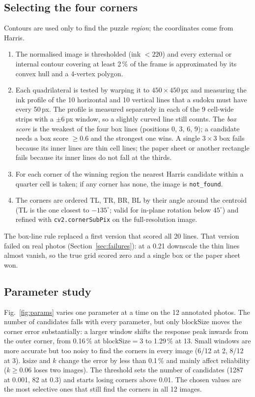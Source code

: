 \documentclass[conference]{IEEEtran}
\begin{document}
\subsection{Selecting the four corners}
Contours are used only to find the puzzle \emph{region}; the coordinates come from Harris.
\begin{enumerate}
\item The normalised image is thresholded (ink $<220$) and every external or internal contour
covering at least 2\,\% of the frame is approximated by its convex hull and a 4-vertex polygon.
\item Each quadrilateral is tested by warping it to $450\times450$\,px and measuring the ink
profile of the 10 horizontal and 10 vertical lines that a sudoku must have every 50\,px. The
profile is measured separately in each of the 9 cell-wide strips with a $\pm6$\,px window, so
a slightly curved line still counts. The \emph{box score} is the weakest of the four box lines
(positions 0, 3, 6, 9); a candidate needs a box score $\geq 0.6$ and the strongest one wins.
A single $3\times3$ box fails because its inner lines are thin cell lines; the paper sheet or
another rectangle fails because its inner lines do not fall at the thirds.
\item For each corner of the winning region the nearest Harris candidate within a quarter
cell is taken; if any corner has none, the image is \texttt{not\_found}.
\item The corners are ordered TL, TR, BR, BL by their angle around the centroid (TL is the one
closest to $-135^\circ$; valid for in-plane rotation below $45^\circ$) and refined with
\texttt{cv2.cornerSubPix} on the full-resolution image.
\end{enumerate}
The box-line rule replaced a first version that scored all 20 lines. That version failed on
real photos (Section~\ref{sec:failures}): at a 0.21 downscale the thin lines almost vanish, so
the true grid scored zero and a single box or the paper sheet won.

\subsection{Parameter study}
Fig.~\ref{fig:params} varies one parameter at a time on the 12 annotated photos. The number of
candidates falls with every parameter, but only $\mathrm{blockSize}$ moves the corner error
substantially: a larger window shifts the response peak inwards from the outer corner, from
0.16\,\% at $\mathrm{blockSize}=3$ to 1.29\,\% at 13. Small windows are more accurate but too
noisy to find the corners in every image (6/12 at 2, 8/12 at 3). $\mathrm{ksize}$ and $k$ change
the error by less than 0.1\,\% and mainly affect reliability ($k\geq0.06$ loses two images).
The threshold sets the number of candidates (1287 at 0.001, 82 at 0.3) and starts losing
corners above 0.01. The chosen values are the most selective ones that still find the corners
in all 12 images.
\end{document}
